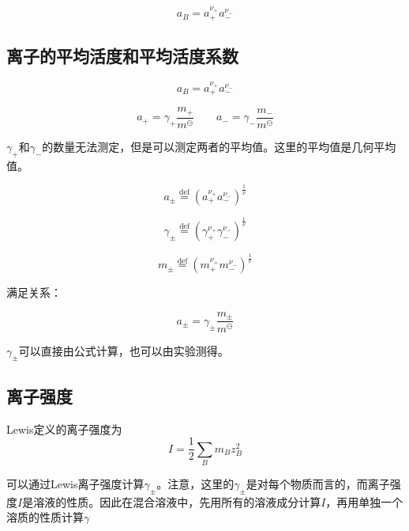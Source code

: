 \[
    a_B = a_+^{\nu_+}a_-^{\nu_-}  
\]

\subsection{离子的平均活度和平均活度系数}

\[
    a_B = a_+^{\nu_+}a_-^{\nu_-}  
\]

\[
    a_+ = \gamma_+ \frac{m_+}{m^\ominus}  \qquad a_- = \gamma_-  \frac{m_-}{m^\ominus}  
\]

$\gamma_+$和$\gamma_-$的数量无法测定，但是可以测定两者的平均值。这里的平均值是几何平均值。

\[
    a_\pm \overset{\mathrm{def}}{=} (a_+^{\nu_+}a_-^{\nu_-})^\frac{1}{\nu} 
\]

\[
    \gamma_\pm \overset{\mathrm{def}}{=} (\gamma_+^{\nu_+}\gamma_-^{\nu_-})^\frac{1}{\nu}   
\]

\[
    m_\pm \overset{\mathrm{def}}{=} (m_+^{\nu_+}m_-^{\nu_-})^\frac{1}{\nu}   
\]

满足关系：

\[
    a_\pm = \gamma_\pm \frac{m_\pm}{m^\ominus}
\]

$\gamma_\pm$可以直接由公式计算，也可以由实验测得。

\subsection{离子强度}

Lewis定义的离子强度为
\[
    I = \frac{1}{2} \sum\limits_{B} m_B z_B^2  
\]

可以通过Lewis离子强度计算$\gamma_\pm$。注意，这里的$\gamma_\pm$是对每个物质而言的，而离子强度$I$是溶液的性质。因此在混合溶液中，先用所有的溶液成分计算$I$，再用单独一个溶质的性质计算$\gamma$
